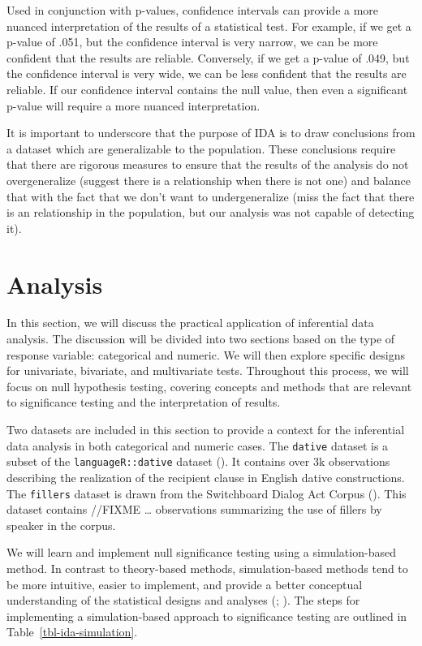 \documentclass[
  letterpaper,
  DIV=11,
  numbers=noendperiod]{scrreprt}
\theoremstyle{definition}
\theoremstyle{remark}
\begin{document}
Used in conjunction with p-values, confidence intervals can provide a
more nuanced interpretation of the results of a statistical test. For
example, if we get a p-value of .051, but the confidence interval is
very narrow, we can be more confident that the results are reliable.
Conversely, if we get a p-value of .049, but the confidence interval is
very wide, we can be less confident that the results are reliable. If
our confidence interval contains the null value, then even a significant
p-value will require a more nuanced interpretation.

It is important to underscore that the purpose of IDA is to draw
conclusions from a dataset which are generalizable to the population.
These conclusions require that there are rigorous measures to ensure
that the results of the analysis do not overgeneralize (suggest there is
a relationship when there is not one) and balance that with the fact
that we don't want to undergeneralize (miss the fact that there is an
relationship in the population, but our analysis was not capable of
detecting it).

\section{Analysis}\label{sec-ida-analysis}

In this section, we will discuss the practical application of
inferential data analysis. The discussion will be divided into two
sections based on the type of response variable: categorical and
numeric. We will then explore specific designs for univariate,
bivariate, and multivariate tests. Throughout this process, we will
focus on null hypothesis testing, covering concepts and methods that are
relevant to significance testing and the interpretation of results.

Two datasets are included in this section to provide a context for the
inferential data analysis in both categorical and numeric cases. The
\texttt{dative} dataset is a subset of the \texttt{languageR::dative}
dataset (). It contains over 3k observations describing the realization of
the recipient clause in English dative constructions. The
\texttt{fillers} dataset is drawn from the Switchboard Dialog Act Corpus
(). This
dataset contains //FIXME \ldots{} observations summarizing the use of
fillers by speaker in the corpus.

We will learn and implement null significance testing using a
simulation-based method. In contrast to theory-based methods,
simulation-based methods tend to be more intuitive, easier to implement,
and provide a better conceptual understanding of the statistical designs
and analyses (; ). The steps
for implementing a simulation-based approach to significance testing are
outlined in Table~\ref{tbl-ida-simulation}.
\end{document}
